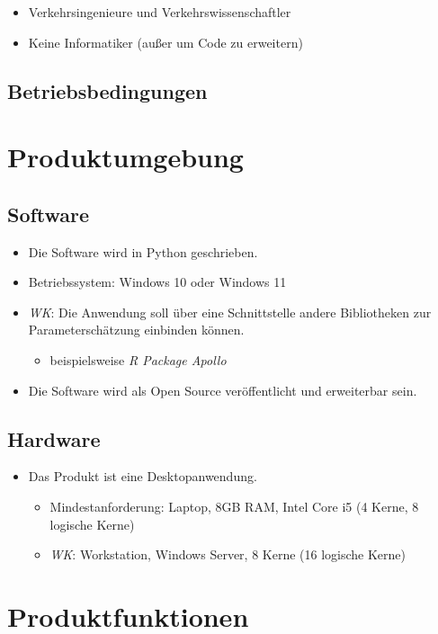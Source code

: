 \documentclass{article}
\begin{document}
\begin{itemize}
    \item Verkehrsingenieure und Verkehrswissenschaftler
    \item Keine Informatiker (außer um Code zu erweitern)
\end{itemize}
  
\subsection{Betriebsbedingungen}

\section{Produktumgebung}
\subsection{Software}
\begin{itemize}
    \item Die Software wird in Python geschrieben.
    \item Betriebssystem: Windows 10 oder Windows 11
    \item \textit{WK}: Die Anwendung soll über eine Schnittstelle andere Bibliotheken zur Parameterschätzung einbinden können.
    \begin{itemize}
        \item beispielsweise \textit{R Package Apollo}
    \end{itemize}
    \item Die Software wird als Open Source veröffentlicht und erweiterbar sein.
\end{itemize}
\subsection{Hardware}
\begin{itemize}
    \item Das Produkt ist eine Desktopanwendung.
    \begin{itemize}
        \item Mindestanforderung: Laptop, 8GB RAM, Intel Core i5 (4 Kerne, 8 logische Kerne)
        \item \textit{WK}: Workstation, Windows Server, 8 Kerne (16 logische Kerne)
    \end{itemize}
\end{itemize}

\section{Produktfunktionen}
\end{document}
